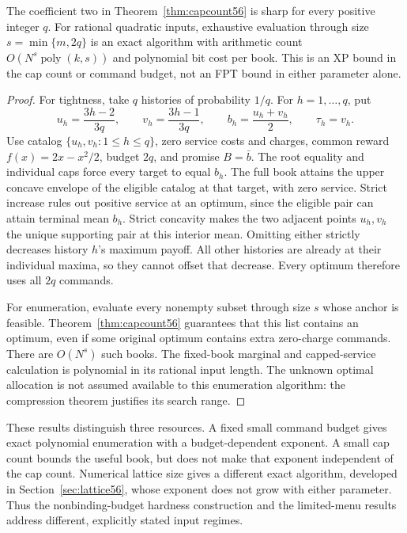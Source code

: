 \begin{proposition}\label{prop:tight56}
The coefficient two in Theorem~\ref{thm:capcount56} is sharp for every positive integer $q$. For rational quadratic inputs, exhaustive evaluation through size $s=\min\{m,2q\}$ is an exact algorithm with arithmetic count $O(N^s\operatorname{poly}(k,s))$ and polynomial bit cost per book. This is an XP bound in the cap count or command budget, not an FPT bound in either parameter alone.
\end{proposition}
\begin{proof}
For tightness, take $q$ histories of probability $1/q$. For $h=1,\ldots,q$, put
\[
 u_h=\frac{3h-2}{3q},\qquad v_h=\frac{3h-1}{3q},\qquad
 b_h=\frac{u_h+v_h}{2},\qquad \tau_h=v_h.
\]
Use catalog $\{u_h,v_h:1\leq h\leq q\}$, zero service costs and charges, common reward $f(x)=2x-x^2/2$, budget $2q$, and promise $B=\bar b$. The root equality and individual caps force every target to equal $b_h$. The full book attains the upper concave envelope of the eligible catalog at that target, with zero service. Strict increase rules out positive service at an optimum, since the eligible pair can attain terminal mean $b_h$. Strict concavity makes the two adjacent points $u_h,v_h$ the unique supporting pair at this interior mean. Omitting either strictly decreases history $h$'s maximum payoff. All other histories are already at their individual maxima, so they cannot offset that decrease. Every optimum therefore uses all $2q$ commands.

For enumeration, evaluate every nonempty subset through size $s$ whose anchor is feasible. Theorem~\ref{thm:capcount56} guarantees that this list contains an optimum, even if some original optimum contains extra zero-charge commands. There are $O(N^s)$ such books. The fixed-book marginal and capped-service calculation is polynomial in its rational input length. The unknown optimal allocation is not assumed available to this enumeration algorithm: the compression theorem justifies its search range.
\end{proof}

These results distinguish three resources. A fixed small command budget gives exact polynomial enumeration with a budget-dependent exponent. A small cap count bounds the useful book, but does not make that exponent independent of the cap count. Numerical lattice size gives a different exact algorithm, developed in Section~\ref{sec:lattice56}, whose exponent does not grow with either parameter. Thus the nonbinding-budget hardness construction and the limited-menu results address different, explicitly stated input regimes.

